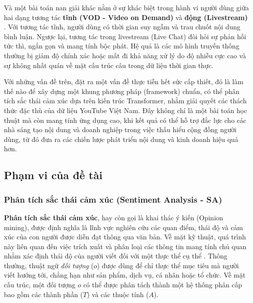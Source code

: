 \documentclass{article}[12pt]
\begin{document}
{    Và một bài toán nan giải khác nằm ở sự khác biệt trong hành vi người dùng giữa hai dạng tương tác \textbf{tĩnh (VOD - Video on Demand)} và \textbf{động (Livestream)} \cite{huo2025live}. Với tương tác tĩnh, người dùng có thời gian suy ngẫm và trau chuốt nội dung bình luận. Ngược lại, tương tác trong livestream (Live Chat) đòi hỏi sự phản hồi tức thì, ngắn gọn và mang tính bộc phát. Hệ quả là các mô hình truyền thống thường bị giảm độ chính xác hoặc mất đi khả năng xử lý do độ nhiễu cực cao và sự không nhất quán về mặt cấu trúc câu trong dữ liệu thời gian thực.
    

    Với những vấn đề trên, đặt ra một vấn đề thực tiễn hết sức cấp thiết, đó là làm thế nào để xây dựng một khung phương pháp (framework) chuẩn, có thể phân tích sắc thái cảm xúc dựa trên kiến trúc Transformer, nhằm giải quyết các thách thức đặc thù của dữ liệu YouTube Việt Nam. Đây không chỉ là một bài toán học thuật mà còn mang tính ứng dụng cao, khi kết quả có thể hỗ trợ đắc lực cho các nhà sáng tạo nội dung và doanh nghiệp trong việc thấu hiểu cộng đồng người dùng, từ đó đưa ra các chiến lược phát triển nội dung và kinh doanh hiệu quả hơn.

    \subsection{Phạm vi của đề tài}
    
    \subsubsection{Phân tích sắc thái cảm xúc (Sentiment Analysis - SA)}

    \textbf{Phân tích sắc thái cảm xúc}, hay còn gọi là khai thác ý kiến (Opinion mining), được định nghĩa là lĩnh vực nghiên cứu các quan điểm, thái độ và cảm xúc của con người được diễn đạt thông qua văn bản. Về mặt kỹ thuật, quá trình này liên quan đến việc trích xuất và phân loại các thông tin mang tính chủ quan nhằm xác định thái độ của người viết đối với một thực thể cụ thể \cite{liu2010sentiment}.
    Thông thường, thuật ngữ \textit{đối tượng} ($o$) được dùng để chỉ thực thể mục tiêu mà người viết hướng tới, chẳng hạn như sản phẩm, dịch vụ, cá nhân hoặc tổ chức. Về mặt cấu trúc, một đối tượng $o$ có thể được phân tách thành một hệ thống phân cấp bao gồm các thành phần ($T$) và các thuộc tính ($A$).
    
}
\end{document}
